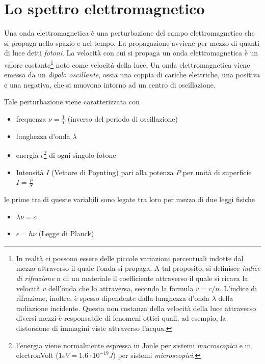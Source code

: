 \documentclass[17pt]{extarticle}
\begin{document}
\clearpage

\section{Lo spettro elettromagnetico}\label{cap:elettromagnetiche}

Una onda elettromagnetica è una perturbazione del campo elettromagnetico che si propaga nello spazio e nel tempo. La propagazione avviene per mezzo di quanti di luce detti \emph{fotoni}. La velocità con cui si propaga un onda elettromagnetica è un valore costante\footnote{In realtà ci possono essere delle piccole variazioni percentuali indotte dal mezzo attraverso il quale l'onda si propaga. A tal proposito, si definisce \emph{indice di rifrazione} n di un materiale il coefficiente attraverso il quale si ricava la velocità $v$ dell'onda che lo attraversa, secondo la formula $v=c/n$. L'indice di rifrazione, inoltre, è spesso dipendente dalla lunghezza d'onda $\lambda$ della radiazione incidente. Questa non costanza della velocità della luce attraverso diversi mezzi è responsabile di fenomeni ottici quali, ad esempio, la distorsione di immagini viste attraverso l'acqua.} noto come velocità della luce. Un onda elettromagnetica viene emessa da un \emph{dipolo oscillante}, ossia una coppia di cariche elettriche, una positiva e una negativa, che si muovono intorno ad un centro di oscillazione. 

Tale perturbazione viene caratterizzata con

\begin{itemize}
	\item frequenza $\nu = \frac{1}{T}$ (inverso del periodo di oscillazione)
	\item lunghezza d'onda $\lambda$
	\item energia $\epsilon$\footnote{l'energia viene normalmente espressa in Joule per sistemi \emph{macroscopici} e in electronVolt ($1eV = 1.6\cdot 10^{-19}J$) per sistemi \emph{microscopici}.} di ogni singolo fotone
	\item Intensità $I$ (Vettore di Poynting) pari alla potenza $P$ per unità di superficie $I = \frac{P}{S}$
\end{itemize}

le prime tre di queste variabili sono legate tra loro per mezzo di due leggi fisiche

\begin{itemize}
	\item $\lambda\nu = c$
	\item $\epsilon = h\nu$ (Legge di Planck)
\end{itemize}
\end{document}
